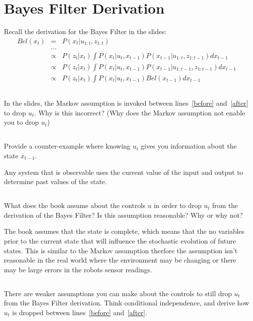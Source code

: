 \documentclass[letterpaper]{article}
\begin{document}
\section{Bayes Filter Derivation}
Recall the derivation for the Bayes Filter in the slides:
\begin{eqnarray}
Bel\left( x_t \right) & = & P\left( x_t | u_{1:t}, z_{1:t} \right) \\
& \ldots & \\
\label{before} & \propto &  P\left( z_t | x_t \right) \int P\left( x_t | u_t, x_{t-1} \right) P\left( x_{t-1} | u_{1:t}, z_{1:t-1} \right) dx_{t-1} \\
\label{after}  & \propto &  P\left( z_t | x_t \right) \int P\left( x_t | u_t, x_{t-1} \right) P\left( x_{t-1} | u_{1:t-1}, z_{1:t-1} \right) dx_{t-1} \\
   & \propto &  P\left( z_t | x_t \right) \int P\left( x_t | u_t, x_{t-1} \right) Bel\left(x_{t-1} \right) dx_{t-1}
\end{eqnarray}

\subsection{}
In the slides, the Markov assumption is invoked between lines~\eqref{before} and~\eqref{after} to drop $u_t$.  Why is this incorrect? (Why does the Markov assumption not enable you to drop $u_t$)
\vfill

\subsection{}
Provide a counter-example where knowing $u_t$ gives you information about the state $x_{t-1}$.

\vspace{5mm}
Any system that is observable uses the current value of the input and output to determine past values of the state. 

\newpage
\subsection{}
What does the book assume about the controls $u$ in order to drop $u_t$ from the derivation of the Bayes Filter?  Is this assumption reasonable?  Why or why not?
\vspace{5mm}

The book assumes that the state is complete, which means that the no variables prior to the current state that will influence the stochastic evolution of future states.  This is similar to the Markov assumption therfore the assumption isn't reasonable in the real world where the environment may be changing or there may be large errors in the robots sensor readings. 

\subsection{}
There are weaker assumptions you can make about the controls to still drop $u_t$ from the Bayes Filter derivation.  Think conditional independence, and derive how $u_t$ is dropped between lines~\eqref{before} and~\eqref{after}.

\vspace{150pt}
\vfill
\end{document}
